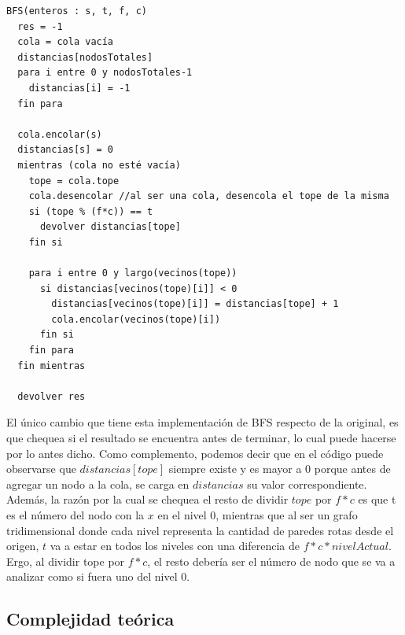             \begin{codesnippet}
            \begin{verbatim}
BFS(enteros : s, t, f, c)
  res = -1
  cola = cola vacía
  distancias[nodosTotales]
  para i entre 0 y nodosTotales-1
    distancias[i] = -1
  fin para

  cola.encolar(s)
  distancias[s] = 0
  mientras (cola no esté vacía)
    tope = cola.tope
    cola.desencolar //al ser una cola, desencola el tope de la misma
    si (tope % (f*c)) == t
      devolver distancias[tope]
    fin si

    para i entre 0 y largo(vecinos(tope))
      si distancias[vecinos(tope)[i]] < 0
        distancias[vecinos(tope)[i]] = distancias[tope] + 1
        cola.encolar(vecinos(tope)[i])
      fin si
    fin para
  fin mientras

  devolver res
            \end{verbatim}
            \end{codesnippet}

            El único cambio que tiene esta implementación de BFS respecto de la original, es que chequea si el resultado se encuentra antes de terminar, lo cual puede hacerse por lo antes dicho. Como complemento, podemos decir que en el código puede observarse que $distancias[tope]$ siempre existe y es mayor a $0$ porque antes de agregar un nodo a la cola, se carga en $distancias$ su valor correspondiente. Además, la razón por la cual se chequea el resto de dividir $tope$ por $f*c$ es que t es el número del nodo con la $x$ en el nivel 0, mientras que al ser un grafo tridimensional donde cada nivel representa la cantidad de paredes rotas desde el origen, $t$ va a estar en todos los niveles con una diferencia de $f*c*nivelActual$. Ergo, al dividir tope por $f*c$, el resto debería ser el número de nodo que se va a analizar como si fuera uno del nivel 0.



    \subsection{Complejidad teórica}

